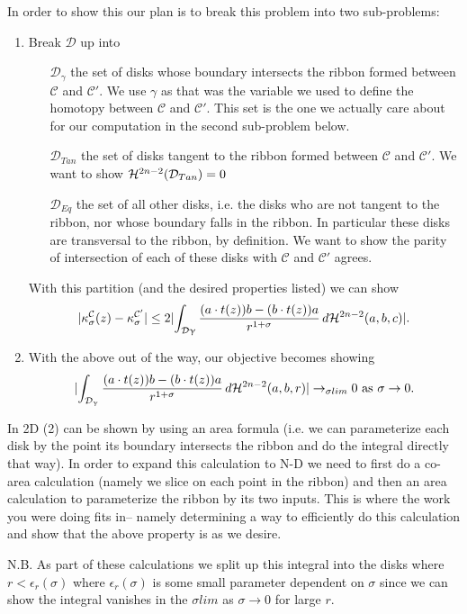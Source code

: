 \documentclass{article}
\newcommand{\haus}[2]{\mathcal{H}^{#1}\parens{#2}}
\begin{document}
In order to show this our plan is to break this problem into two sub-problems:
\begin{enumerate}
  \item Break $\mathcal{D}$ up into
    \begin{itemize}
      \item[$\mathcal{D}_{\gamma}$] the set of disks whose boundary intersects the ribbon formed between $\mathcal{C}$ and $\mathcal{C}'$. We use $\gamma$ as that was the variable we used to define the homotopy between $\mathcal{C}$ and $\mathcal{C}'$. This set is the one we actually care about for our computation in the second sub-problem below.
      \item[$\mathcal{D}_{Tan}$] the set of disks tangent to the ribbon formed between $\mathcal{C}$ and $\mathcal{C}'$. We want to show $\haus{2n-2}{\mathcal{D}_{Tan}} = 0$
      \item[$\mathcal{D}_{Eq}$] the set of all other disks, i.e. the disks who are not tangent to the ribbon, nor whose boundary falls in the ribbon. In particular these disks are transversal to the ribbon, by definition. We want to show the parity of intersection of each of these disks with $\mathcal{C}$ and $\mathcal{C}'$ agrees.
    \end{itemize}
    With this partition (and the desired properties listed) we can show
    $$
    \abs{ \kappa_\sigma^\mathcal{C}(z) - \kappa_\sigma^{\mathcal{C}'} }
    \le 2 \abs{\int_{\mathcal{D}\gamma} \frac{\parens{a \cdot t(z)}b - \parens{b \cdot t(z)} a}{r^{1+\sigma}} \, d\haus{2n-2}{a,b,c}} .
    $$
\item With the above out of the way, our objective becomes showing
  $$
    \abs{ \int_{\mathcal{D}_{\gamma}} \frac{ \parens{a \cdot t(z)}b - \parens{b \cdot t(z)} a}{r^{1+\sigma}} \, d\haus{2n-2}{a,b,r} } \to_{\sigma lim} 0 \textup{ as } \sigma \to 0.
  $$
\end{enumerate}

In 2D (2) can be shown by using an area formula (i.e. we can parameterize each disk by the point its boundary intersects the ribbon and do the integral directly that way). In order to expand this calculation to N-D we need to first do a co-area calculation (namely we slice on each point in the ribbon) and then an area calculation to parameterize the ribbon by its two inputs. This is where the work you were doing fits in-- namely determining a way to efficiently do this calculation and show that the above property is as we desire.

N.B. As part of these calculations we split up this integral into the disks where $r < \epsilon_r(\sigma)$ where $\epsilon_r(\sigma)$ is some small parameter dependent on $\sigma$ since we can show the integral vanishes in the $\sigma lim$ as $\sigma \to 0$ for large $r$.
\end{document}
